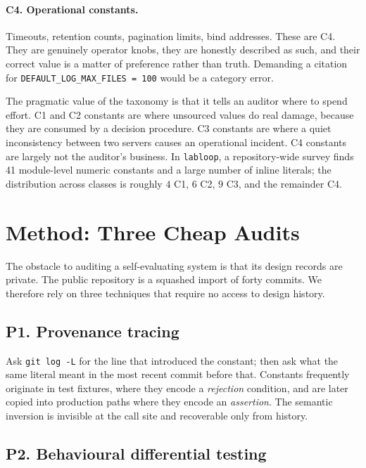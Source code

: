 \documentclass[10pt,twocolumn,letterpaper]{article}
\newcommand{\code}[1]{\texttt{#1}}
\begin{document}
\paragraph{C4. Operational constants.} Timeouts, retention counts, pagination limits, bind
addresses. These are C4. They are genuinely operator knobs, they are honestly described as such,
and their correct value is a matter of preference rather than truth. Demanding a citation for
\code{DEFAULT\_LOG\_MAX\_FILES = 100} would be a category error.

The pragmatic value of the taxonomy is that it tells an auditor where to spend effort. C1 and C2
constants are where unsourced values do real damage, because they are consumed by a decision
procedure. C3 constants are where a quiet inconsistency between two servers causes an operational
incident. C4 constants are largely not the auditor's business. In \code{labloop}, a repository-wide
survey finds 41 module-level numeric constants and a large number of inline literals; the
distribution across classes is roughly $4$ C1, $6$ C2, $9$ C3, and the remainder C4.

\section{Method: Three Cheap Audits}
\label{sec:method}

The obstacle to auditing a self-evaluating system is that its design records are private. The
public repository is a squashed import of forty commits. We therefore rely on three techniques
that require no access to design history.

\subsection{P1. Provenance tracing}
\label{sec:p1}

Ask \code{git log -L} for the line that introduced the constant; then ask what the same literal
meant in the most recent commit before that. Constants frequently originate in test fixtures, where
they encode a \emph{rejection} condition, and are later copied into production paths where they
encode an \emph{assertion}. The semantic inversion is invisible at the call site and recoverable
only from history.

\subsection{P2. Behavioural differential testing}
\label{sec:p2}
\end{document}
